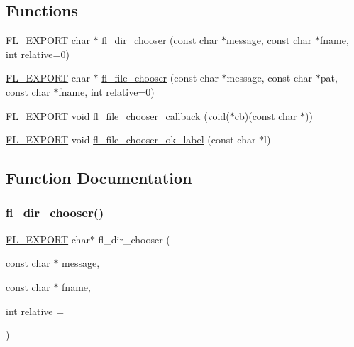 \subsection*{Functions}
\begin{DoxyCompactItemize}
\item 
\hyperlink{_fl___export_8_h_aa9ba29a18aee9d738370a06eeb4470fc}{F\+L\+\_\+\+E\+X\+P\+O\+RT} char $\ast$ \hyperlink{_fl___file___chooser_8_h_ae3ae191ce4e7fa9bdd4030e2567095f5}{fl\+\_\+dir\+\_\+chooser} (const char $\ast$message, const char $\ast$fname, int relative=0)
\item 
\hyperlink{_fl___export_8_h_aa9ba29a18aee9d738370a06eeb4470fc}{F\+L\+\_\+\+E\+X\+P\+O\+RT} char $\ast$ \hyperlink{_fl___file___chooser_8_h_a0bc2c9299b75de71f65ae51a6875cade}{fl\+\_\+file\+\_\+chooser} (const char $\ast$message, const char $\ast$pat, const char $\ast$fname, int relative=0)
\item 
\hyperlink{_fl___export_8_h_aa9ba29a18aee9d738370a06eeb4470fc}{F\+L\+\_\+\+E\+X\+P\+O\+RT} void \hyperlink{_fl___file___chooser_8_h_a425d672c86c37b22cd161f74f030de84}{fl\+\_\+file\+\_\+chooser\+\_\+callback} (void($\ast$cb)(const char $\ast$))
\item 
\hyperlink{_fl___export_8_h_aa9ba29a18aee9d738370a06eeb4470fc}{F\+L\+\_\+\+E\+X\+P\+O\+RT} void \hyperlink{_fl___file___chooser_8_h_aba3ec3e0540481bce2212b6408a08dbf}{fl\+\_\+file\+\_\+chooser\+\_\+ok\+\_\+label} (const char $\ast$l)
\end{DoxyCompactItemize}


\subsection{Function Documentation}
\mbox{\label{_fl___file___chooser_8_h_ae3ae191ce4e7fa9bdd4030e2567095f5}} 
\subsubsection{\texorpdfstring{fl\+\_\+dir\+\_\+chooser()}{fl\_dir\_chooser()}}
{\footnotesize\ttfamily \hyperlink{_fl___export_8_h_aa9ba29a18aee9d738370a06eeb4470fc}{F\+L\+\_\+\+E\+X\+P\+O\+RT} char$\ast$ fl\+\_\+dir\+\_\+chooser (\begin{DoxyParamCaption}\item[{const char $\ast$}]{message,  }\item[{const char $\ast$}]{fname,  }\item[{int}]{relative = {} }\end{DoxyParamCaption})}

